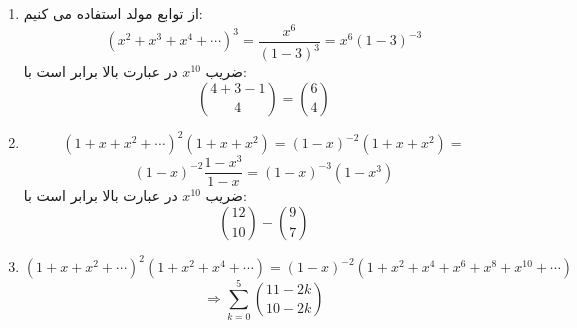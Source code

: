 \p
\begin{enumerate}
\item
از توابع مولد استفاده می کنیم:
$$(x^2 + x^3 + x^4 + \cdots)^3 = \frac{x^6}{(1-3)^3} = x^6(1-3)^{-3}$$
ضریب
$x^{10}$
در عبارت بالا برابر است با:
$$\binom{4+3-1}{4} = \binom{6}{4}$$
\item
$$(1 + x + x^2 + \cdots)^2(1 + x + x^2) = (1-x)^{-2}(1 + x + x^2) = $$
$$(1 - x)^{-2} \frac{1-x^3}{1-x} = (1-x)^{-3}(1-x^3)$$
ضریب
$x^{10}$
در عبارت بالا برابر است با:
$$\binom{12}{10} - \binom{9}{7}$$
\item
$$(1 + x + x^2 + \cdots)^2(1 + x^2 + x^4 + \cdots) = (1 - x)^{-2}(1 + x^2 + x^4 + x^6 + x^8 + x^{10} + \cdots)$$
$$\Rightarrow \sum_{k=0}^{5}\binom{11 - 2k}{10 - 2k}$$
\end{enumerate}
